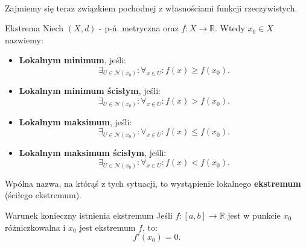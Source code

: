 \documentclass{article}
\numberwithin{defi}{section}
\numberwithin{defi}{section}
\newcommand{\R}{\mathbb{R}}
\newcommand{\Nau}{\mathcal{N}}
\renewcommand{\geq}{\geqslant}
\renewcommand{\leq}{\leqslant}
\begin{document}
    \paragraph{} Zajmiemy się teraz związkiem pochodnej z własnościami funkcji rzeczywistych.

    \begin{defr}{Ekstrema}
        Niech $(X, d)$ - p-ń. metryczna oraz $f: X \to \R$. Wtedy $x_0 \in X$ nazwiemy: \begin{itemize}
            \item \textbf{Lokalnym minimum}, jeśli: \begin{equation}
                \exists_{U \in \Nau(x_0)}: \forall_{x \in U}: f(x) \geq f(x_0).
            \end{equation}

            \item \textbf{Lokalnym minimum ścisłym}, jeśli: \begin{equation}
                \exists_{U \in \Nau(x_0)}: \forall_{x \in U}: f(x) > f(x_0).
            \end{equation}

            \item \textbf{Lokalnym maksimum}, jeśli: \begin{equation}
                \exists_{U \in \Nau(x_0)}: \forall_{x \in U}: f(x) \leq f(x_0).
            \end{equation}

            \item \textbf{Lokalnym maksimum ścisłym}, jeśli: \begin{equation}
                \exists_{U \in \Nau(x_0)}: \forall_{x \in U}: f(x) < f(x_0).
            \end{equation}

        \end{itemize} Wpólna nazwa, na którąś z tych sytuacji, to wystąpienie lokalnego \textbf{ekstremum} (ściłego ekstremum). 
    \end{defr}

    \begin{twier}{Warunek konieczny istnienia ekstremum}
        Jeśli $f: [a, b] \to \R$ jest w punkcie $x_0$ różniczkowalna i $x_0$ jest ekstremum $f$, to: \begin{equation}
            f'(x_0) = 0.
        \end{equation}
    \end{twier}
\end{document}
